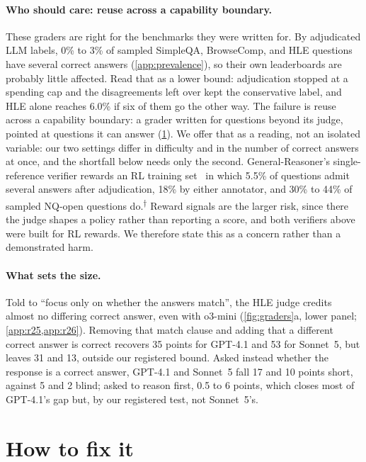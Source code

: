 \documentclass{article}
\newcommand{\ph}{\textsuperscript{$\dagger$}}
\begin{document}
\paragraph{Who should care: reuse across a capability boundary.}
These graders are right for the benchmarks they were written for.
By adjudicated LLM labels, 0\% to 3\% of sampled SimpleQA, BrowseComp, and HLE questions have several correct answers (\cref{app:prevalence}), so their own leaderboards are probably little affected. Read that as a lower bound: adjudication stopped at a spending cap and the disagreements left over kept the conservative label, and HLE alone reaches 6.0\% if six of them go the other way.
The failure is reuse across a capability boundary: a grader written for questions beyond its judge, pointed at questions it can answer (\cref{sec:fix}). We offer that as a reading, not an isolated variable: our two settings differ in difficulty and in the number of correct answers at once, and the shortfall below needs only the second.
General-Reasoner's single-reference verifier rewards an RL training set~\citep{ma2025generalreasoner} in which 5.5\% of questions admit several answers after adjudication, 18\% by either annotator, and 30\% to 44\% of sampled NQ-open questions do.\ph{}
Reward signals are the larger risk, since there the judge shapes a policy rather than reporting a score, and both verifiers above were built for RL rewards.
We therefore state this as a concern rather than a demonstrated harm.

\paragraph{What sets the size.}
Told to ``focus only on whether the answers match'', the HLE judge credits almost no differing correct answer, even with o3-mini (\cref{fig:graders}a, lower panel; \cref{app:r25,app:r26}).
Removing that match clause and adding that a different correct answer is correct recovers 35 points for GPT-4.1 and 53 for Sonnet~5, but leaves 31 and 13, outside our registered bound.
Asked instead whether the response is a correct answer, GPT-4.1 and Sonnet~5 fall 17 and 10 points short, against 5 and 2 blind; asked to reason first, 0.5 to 6 points, which closes most of GPT-4.1's gap but, by our registered test, not Sonnet~5's.

\section{How to fix it}
\label{sec:fix}
\end{document}
